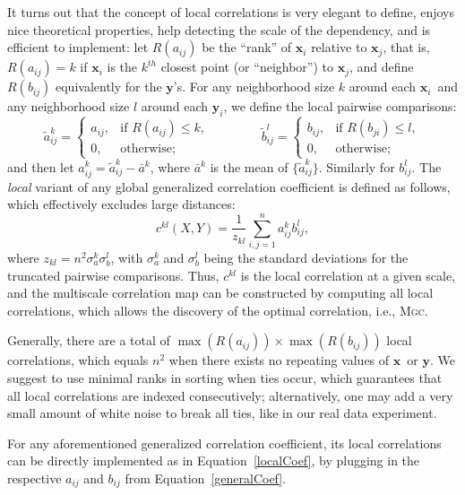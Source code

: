 \documentclass[11pt]{article}
\providecommand{\sct}[1]{{\normalfont\textsc{#1}}}
\providecommand{\mt}[1]{\widetilde{#1}}
\providecommand{\mb}[1]{\boldsymbol{#1}}
\newcommand{\G}{c}
\newcommand{\Mgc}{\sct{Mgc}}
\newcommand{\mbx}{\ensuremath{\mb{x}}}
\newcommand{\mby}{\ensuremath{\mb{y}}}
\begin{document}
It turns out that the concept of local correlations is very elegant to define, enjoys nice theoretical properties, help detecting the scale of the dependency, and is efficient to implement: let $R(a_{ij})$  be the ``rank'' of $\mb{x}_i$ relative to $\mb{x}_j$, that is, $R(a_{ij})=k$ if $\mb{x}_i$ is the $k^{th}$ closest point (or ``neighbor'') to $\mb{x}_j$, and define $R(b_{ij})$ equivalently for the \mby's. For any neighborhood size $k$ around each $\mb{x}_i$~and any neighborhood size $l$ around each $\mb{y}_i$, we define the local pairwise comparisons:
\begin{equation}
\label{localCoef2}
    \mt{a}_{ij}^k=
    \begin{cases}
      a_{ij}, & \text{if } R(a_{ij}) \leq k, \\    
      0, & \text{otherwise};
    \end{cases} \qquad \qquad
    \mt{b}_{ij}^l=
    \begin{cases}
      b_{ij}, & \text{if } R(b_{ji}) \leq l, \\
      0, & \text{otherwise};
    \end{cases}
\end{equation}
and then let $a^k_{ij}=\mt{a}^k_{ij} - \bar{a}^k$, 
where $\bar{a}^k$ is the mean of $\{\mt{a}_{ij}^{k}\}$. Similarly for $b^l_{ij}$.
The \emph{local} variant of any global generalized correlation coefficient is defined as follows, which effectively excludes large distances:
\begin{equation}
\label{localCoef}
\G^{kl}(X,Y)=\dfrac{1}{z_{kl}} {\textstyle \sum_{i,j=1}^n a_{ij}^k b_{ij}^l},
\end{equation}
where $z_{kl}=n^2 \sigma_a^k \sigma_b^l$,  with $\sigma_a^k$ and $\sigma_b^{l}$ being the standard deviations for the truncated pairwise comparisons. Thus, $c^{kl}$ is the local correlation at a given scale, and the multiscale correlation map can be constructed by computing all local correlations, which allows the discovery of the optimal correlation, i.e., \Mgc. 

Generally, there are a total of $\max(R(a_{ij})) \times \max(R(b_{ij}))$ local correlations, which equals $n^2$ when there exists no repeating values of \mbx~or \mby. We suggest to use minimal ranks in sorting when ties occur, which guarantees that all local correlations are indexed consecutively; alternatively, one may add a very small amount of white noise to break all ties, like in our real data experiment.

For any aforementioned generalized correlation coefficient, its local correlations can be directly implemented as in Equation~\ref{localCoef}, by plugging in the respective $a_{ij}$ and $b_{ij}$ from Equation~\ref{generalCoef}. 
\end{document}
